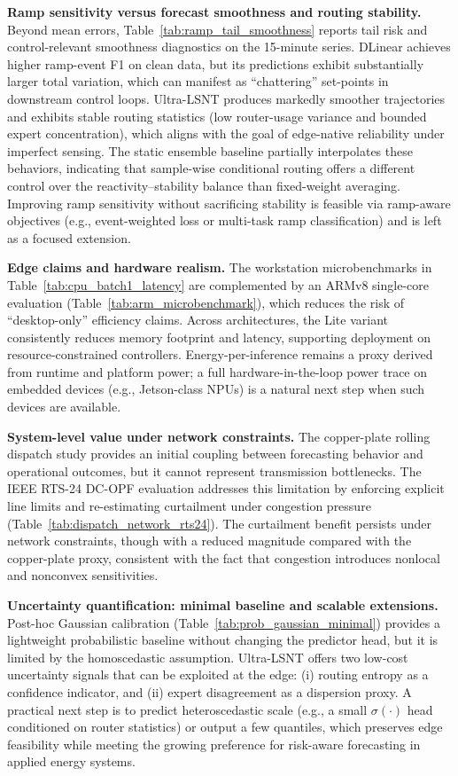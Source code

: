 \documentclass[review,3p,times]{elsarticle}
\begin{document}
\textbf{Ramp sensitivity versus forecast smoothness and routing stability.}
Beyond mean errors, Table~\ref{tab:ramp_tail_smoothness} reports tail risk and control-relevant smoothness diagnostics on the 15-minute series.
DLinear achieves higher ramp-event F1 on clean data, but its predictions exhibit substantially larger total variation, which can manifest as ``chattering'' set-points in downstream control loops.
Ultra-LSNT produces markedly smoother trajectories and exhibits stable routing statistics (low router-usage variance and bounded expert concentration), which aligns with the goal of edge-native reliability under imperfect sensing.
The static ensemble baseline partially interpolates these behaviors, indicating that sample-wise conditional routing offers a different control over the reactivity--stability balance than fixed-weight averaging.
Improving ramp sensitivity without sacrificing stability is feasible via ramp-aware objectives (e.g., event-weighted loss or multi-task ramp classification) and is left as a focused extension.

\textbf{Edge claims and hardware realism.}
The workstation microbenchmarks in Table~\ref{tab:cpu_batch1_latency} are complemented by an ARMv8 single-core evaluation (Table~\ref{tab:arm_microbenchmark}), which reduces the risk of ``desktop-only'' efficiency claims.
Across architectures, the Lite variant consistently reduces memory footprint and latency, supporting deployment on resource-constrained controllers.
Energy-per-inference remains a proxy derived from runtime and platform power; a full hardware-in-the-loop power trace on embedded devices (e.g., Jetson-class NPUs) is a natural next step when such devices are available.

\textbf{System-level value under network constraints.}
The copper-plate rolling dispatch study provides an initial coupling between forecasting behavior and operational outcomes, but it cannot represent transmission bottlenecks.
The IEEE RTS-24 DC-OPF evaluation addresses this limitation by enforcing explicit line limits and re-estimating curtailment under congestion pressure (Table~\ref{tab:dispatch_network_rts24}).
The curtailment benefit persists under network constraints, though with a reduced magnitude compared with the copper-plate proxy, consistent with the fact that congestion introduces nonlocal and nonconvex sensitivities.

\textbf{Uncertainty quantification: minimal baseline and scalable extensions.}
Post-hoc Gaussian calibration (Table~\ref{tab:prob_gaussian_minimal}) provides a lightweight probabilistic baseline without changing the predictor head, but it is limited by the homoscedastic assumption.
Ultra-LSNT offers two low-cost uncertainty signals that can be exploited at the edge: (i) routing entropy as a confidence indicator, and (ii) expert disagreement as a dispersion proxy.
A practical next step is to predict heteroscedastic scale (e.g., a small $\sigma(\cdot)$ head conditioned on router statistics) or output a few quantiles, which preserves edge feasibility while meeting the growing preference for risk-aware forecasting in applied energy systems.
\end{document}
